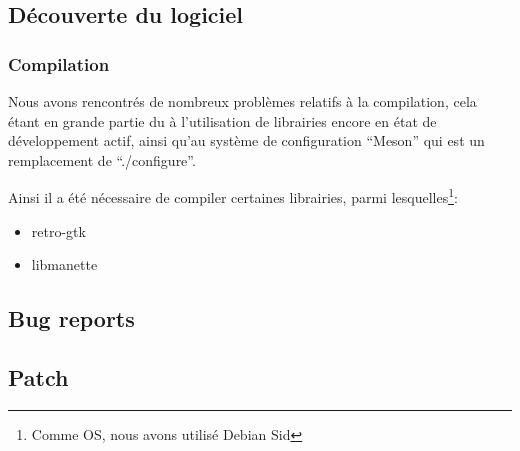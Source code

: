 \documentclass[12pt]{report}
\begin{document}
\subsection{Découverte du logiciel}
\subsubsection{Compilation}
Nous avons rencontrés de nombreux problèmes relatifs à la compilation,
cela étant en grande partie du à l'utilisation de librairies encore en
état de développement actif, ainsi qu'au système de configuration
``Meson'' qui est un remplacement de ``./configure''.

Ainsi il a été nécessaire de compiler certaines librairies, parmi
lesquelles\footnote{Comme OS, nous avons utilisé Debian Sid}:
\begin{itemize}
\item retro-gtk
\item libmanette
\end{itemize}


\subsection{Bug reports}

\subsection{Patch}
\end{document}
